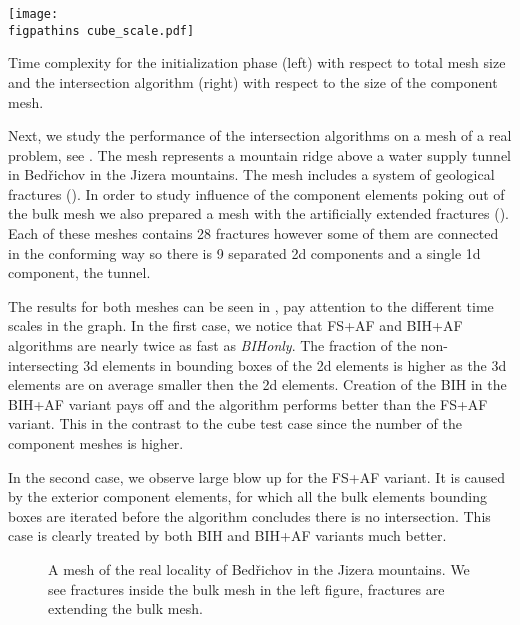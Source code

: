 \begin{graph}[!htb]
    \centering
    \texttt{[image: \\figpathins cube\_scale.pdf]}
    \caption[Time complexity of intersection algorithms.]
    {Time complexity for the initialization phase (left) with respect to total mesh size and the intersection algorithm (right) with respect to the size of the component mesh.}
    \label{graph:cube_speed}
\end{graph}



Next, we study the performance of the intersection algorithms on a mesh of a real problem, see .
The mesh represents a mountain ridge above a water supply tunnel in Bed{\v r}ichov in the Jizera mountains.
The mesh includes a system of geological fractures (). In order to study influence of the component elements poking out of
the bulk mesh we also prepared a mesh with the artificially extended fractures (). 
Each of these meshes contains 28 fractures however some of them are connected in the conforming way so there is 9 separated 2d components and a 
single 1d component, the tunnel.

The results for both meshes can be seen in , pay attention to the different time
scales in the graph. In the first case, we notice that FS+AF and BIH+AF algorithms are nearly twice as fast as \emph{BIHonly}.
The fraction of the non-intersecting 3d elements in bounding boxes of the 2d elements is higher as the 3d elements are on average smaller then the 2d elements.
Creation of the BIH in the BIH+AF variant pays off and the algorithm performs better than the FS+AF variant.
This in the contrast to the cube test case since the number of the component meshes is higher.

In the second case, we observe large blow up for the FS+AF variant. It is caused by the exterior component elements, 
for which all the bulk elements bounding boxes are iterated before the algorithm concludes there is no intersection.
This case is clearly treated by both BIH and BIH+AF variants much better.



\begin{figure}[!htb]
    \hspace{3pt}
    \caption[Mesh of the real locality of Bed{\v r}ichov in the Jizera mountains.]
    {A mesh of the real locality of Bed{\v r}ichov in the Jizera mountains.
             We see fractures inside the bulk mesh in the left figure,
             fractures are extending the bulk mesh.}
    \label{fig:bedrichov_meshes}
\end{figure}

